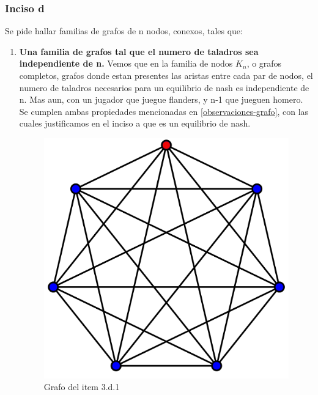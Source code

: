 \subsubsection{Inciso d}

Se pide hallar familias de grafos de n nodos, conexos, tales que:
\begin{enumerate}
	\item \textbf{Una familia de grafos tal que el numero de taladros sea independiente de n.} Vemos que en la familia de nodos $K_n$, o grafos completos, grafos donde estan presentes las aristas entre cada par de nodos, el numero de taladros necesarios para un equilibrio de nash es independiente de n. Mas aun, con un jugador que juegue flanders, y n-1 que jueguen homero. Se cumplen ambas propiedades mencionadas en \ref{observaciones-grafo}, con las cuales justificamos en el inciso a que es un equilibrio de nash.
	\begin{figure}
	  \centering	
		\includegraphics[scale=0.20]{fig/Kn.png}
	  \caption{Grafo del item 3.d.1}
	\end{figure}


\end{enumerate}
